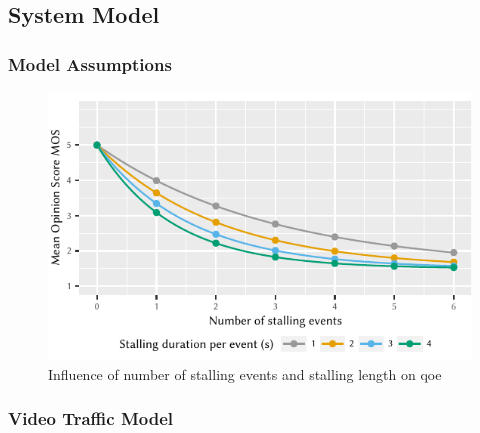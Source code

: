 \subsection{System Model}\label{sec:application:lte_video:system_model}

\subsubsection*{Model Assumptions}\label{sec:application:lte_video:system_model:model_assumptions}

\begin{figure}
  \includegraphics{application/lte_video/system_model/figures/stalling2qoe}
  \caption{Influence of number of stalling events and stalling length on \gls{qoe}~\cite{hossfeld2012a}}
  \label{fig:application:lte_video:system_model:stalling2qoe}
\end{figure}

\subsubsection*{Video Traffic Model}\label{sec:application:lte_video:system_model:video_traffic}


